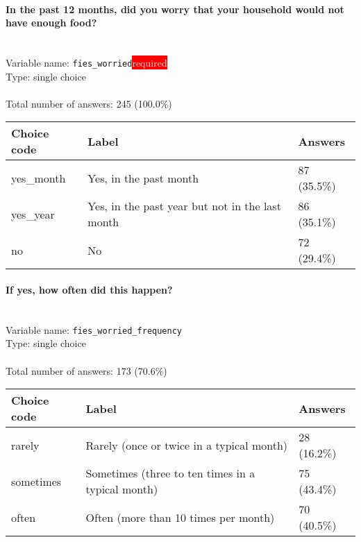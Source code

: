 \documentclass[11.5pt, a4paper]{scrartcl}
\begin{document}
\paragraph{In the past 12 months, did you worry that your household would not have enough food?}
\  \\Variable name: \texttt{fies\_worried}\hfill\colorbox{red}{\small{\textcolor{white}{required}}}\\
 Type: single choice\\
\\Total number of answers: 245 (100.0\%)
\\[0.2em] \begin{tabular}{p{4cm}|p{8cm}|p{3cm}}
Choice code & Label & Answers \\
\hline
yes\_month & Yes, in the past month& \cellcolor{color1}87 (35.5\%)\\
\cellcolor{mygray} yes\_year & \cellcolor{mygray}Yes, in the past year but not in the last month & \cellcolor{color1}86 (35.1\%)\\
no & No& \cellcolor{color1}72 (29.4\%)\\
\end{tabular}
\paragraph{If yes, how often did this happen? }
\  \\Variable name: \texttt{fies\_worried\_frequency}\\
Type: single choice\\
\\Total number of answers: 173 (70.6\%)
\\[0.2em] \begin{tabular}{p{4cm}|p{8cm}|p{3cm}}
Choice code & Label & Answers \\
\hline
rarely & Rarely (once or twice in a typical month)& \cellcolor{color0}28 (16.2\%)\\
\cellcolor{mygray} sometimes & \cellcolor{mygray}Sometimes (three to ten times in a typical month) & \cellcolor{color2}75 (43.4\%)\\
often & Often (more than 10 times per month)& \cellcolor{color2}70 (40.5\%)\\
\end{tabular}
\end{document}
